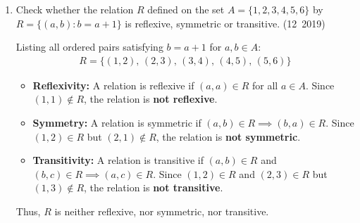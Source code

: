 \begin{enumerate}[label=\thesubsection.\arabic*, ref=\thesubsection.\theenumi]
\solution
Let $\Delta$ denote the given determinant. Applying the column operation $C_1 \to C_1 + C_2 + C_3$ in accordance with \eqref{eq:CBSE12-2019-det_shear_invariance}:
\begin{align}
	\Delta = \mydet{
		a+b+c & -a+b & -a+c \\
		a+b+c & 3b & -b+c \\
		a+b+c & -c+b & 3c
	}
\end{align}
Factoring out $\brak{a+b+c}$ from column $C_1$:
\begin{align}
	\Delta = \brak{a+b+c} \mydet{
		1 & -a+b & -a+c \\
		1 & 3b & -b+c \\
		1 & -c+b & 3c
	}
\end{align}
Applying row operations $R_2 \to R_2 - R_1$ and $R_3 \to R_3 - R_1$:
\begin{align}
	\Delta = \brak{a+b+c} \mydet{
		1 & -a+b & -a+c \\
		0 & a+2b & a-b \\
		0 & a-c & a+2c
	}
\end{align}
Expanding along column $C_1$:
\begin{align}
	\Delta &= \brak{a+b+c} \mydet{a+2b & a-b \\ a-c & a+2c} \\
	&= \brak{a+b+c} \sbrak{\brak{a+2b}\brak{a+2c} - \brak{a-b}\brak{a-c}} \\
	&= \brak{a+b+c} \sbrak{\brak{a^2 + 2ac + 2ab + 4bc} - \brak{a^2 - ac - ab + bc}} \\
	&= \brak{a+b+c}\brak{3ab + 3bc + 3ca} \\
	&= 3\brak{a+b+c}\brak{ab + bc + ca}
\end{align}


\item Check whether the relation $R$ defined on the set $A = \{1, 2, 3, 4, 5, 6\}$ by $R = \{(a, b) : b = a + 1\}$ is reflexive, symmetric or transitive.
\hfill (12~2019)

\solution

Listing all ordered pairs satisfying $b = a + 1$ for $a, b \in A$:
\begin{align}
	R = \{(1, 2), \, (2, 3), \, (3, 4), \, (4, 5), \, (5, 6)\}
\end{align}

\begin{itemize}
	\item \textbf{Reflexivity:} A relation is reflexive if $(a, a) \in R$ for all $a \in A$. Since $(1, 1) \notin R$, the relation is \textbf{not reflexive}.
	\item \textbf{Symmetry:} A relation is symmetric if $(a, b) \in R \implies (b, a) \in R$. Since $(1, 2) \in R$ but $(2, 1) \notin R$, the relation is \textbf{not symmetric}.
	\item \textbf{Transitivity:} A relation is transitive if $(a, b) \in R$ and $(b, c) \in R \implies (a, c) \in R$. Since $(1, 2) \in R$ and $(2, 3) \in R$ but $(1, 3) \notin R$, the relation is \textbf{not transitive}.
\end{itemize}
Thus, $R$ is neither reflexive, nor symmetric, nor transitive.


\end{enumerate}
